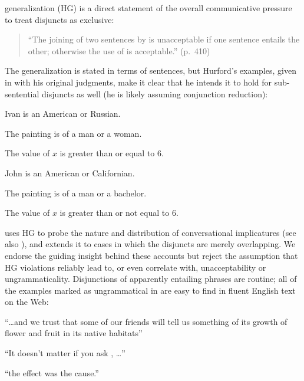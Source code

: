 \documentclass{article}
\begin{document}
 generalization (HG) is a direct statement of
the overall communicative pressure to treat disjuncts as exclusive:
%
\begin{quote}
  ``The joining of two sentences by  is unacceptable if one
  sentence entails the other; otherwise the use of  is
  acceptable.'' (p.~410)
\end{quote}
%
The generalization is stated in terms of sentences, but Hurford's
examples, given in  with his original judgments, make it clear
that he intends it to hold for sub-sentential disjuncts as well (he is
likely assuming conjunction reduction):
%
\begin{examples}
\item\label{hex}
  \begin{examples}
  \item Ivan is an American or Russian.
  \item The painting is of a man or a woman.
  \item The value of $x$ is greater than or equal to 6.
  \item\label{ex-bad1}\bad John is an American or Californian.
  \item\label{ex-bad2}\bad The painting is of a man or a bachelor.
  \item\label{ex-bad3}\bad The value of $x$ is greater than or not equal to 6.
  \end{examples}
\end{examples}

\citeauthor{Hurford:1974} uses HG to probe the nature and distribution
of conversational implicatures (see also
\citealt{Gazdar79b,ChierchiaFoxSpector08}), and \citet{Singh:2008}
extends it to cases in which the disjuncts are merely overlapping. We
endorse the guiding insight behind these accounts but reject the
assumption that HG violations reliably lead to, or even correlate
with, unacceptability or ungrammaticality. Disjunctions of apparently
entailing phrases are routine; all of the examples marked as
ungrammatical in  are easy to find in fluent English text on
the Web:
%
\begin{examples}
\item\label{hex-good}
  \begin{examples}
  \item ``\ldots and we trust that some of our 
    friends will tell us something of its growth of flower and fruit
    in its native habitats''
  \item ``It doesn't matter if you ask , \ldots''
  \item ``the effect was  the cause.''
  \end{examples}
\end{examples}
\end{document}
